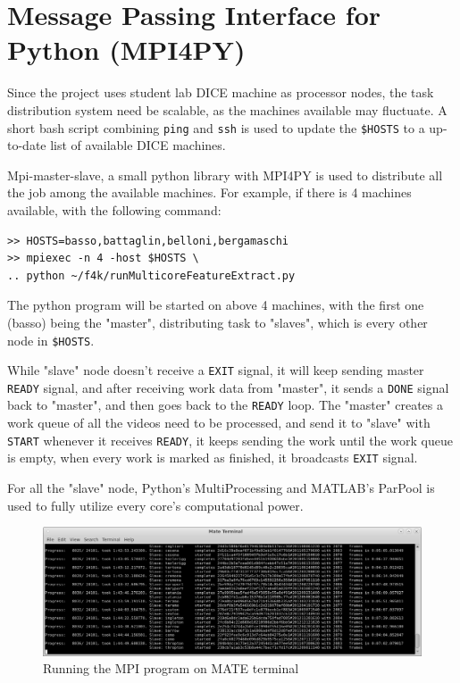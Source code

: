\documentclass[bsc,logo,twoside,fullspacing,parskip]{infthesis}
\begin{document}
\section{Message Passing Interface for Python (MPI4PY)}

Since the project uses student lab DICE machine as processor nodes, the task distribution system need be scalable, as the machines available may fluctuate.
A short bash script combining {\tt ping} and {\tt ssh} is used to update the {\tt \$HOSTS} to a up-to-date list of available DICE machines.

Mpi-master-slave, a small python library with MPI4PY is used to distribute all the job among the available machines. 
For example, if there is 4 machines available, with the following command: 
\lstset{basicstyle=\footnotesize\ttfamily,breaklines=true}
\begin{lstlisting}[frame=single]
>> HOSTS=basso,battaglin,belloni,bergamaschi
>> mpiexec -n 4 -host $HOSTS \
.. python ~/f4k/runMulticoreFeatureExtract.py
\end{lstlisting}
The python program will be started on above 4 machines, with the first one (basso) being the "master", distributing task to "slaves", which is every other node in {\tt \$HOSTS}. 

While "slave" node doesn't receive a {\tt EXIT} signal, it will keep sending master {\tt READY} signal, and after receiving work data from "master", it sends a {\tt DONE} signal back to "master", and then goes back to the {\tt READY} loop. The "master" creates a work queue of all the videos need to be processed, and send it to "slave" with {\tt START} whenever it receives {\tt READY}, it keeps sending the work until the work queue is empty, when every work is marked as finished, it broadcasts {\tt EXIT} signal.

For all the "slave" node, Python's MultiProcessing and MATLAB's ParPool is used to fully utilize every core's computational power.

\begin{figure}[!b]
    \centering
    \includegraphics[scale=0.35]{graph/sample_terminal.png}
    \caption{Running the MPI program on MATE terminal}
    \label{fig:mpi}
\end{figure}
\end{document}
